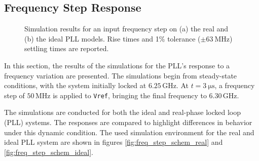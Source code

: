 \documentclass[lettersize,journal]{IEEEtran}
\begin{document}
\subsection{Frequency Step Response}
\label{sec:freq_step}
\begin{figure}[!ht]
    \centering
    \hfil
    \hfil
    \caption{Simulation results for an input frequency step on (a) the real and (b) the ideal PLL models. Rise times and 1\% tolerance ($\pm\SI{63}{\mega\hertz}$) settling times are reported.}
    \label{fig:freq_step_results}
\end{figure}

In this section, the results of the simulations for the PLL’s response to a frequency variation are presented. The simulations begin from steady-state conditions, with the system initially locked at \(6.25 \, \text{GHz}\). At \(t=\SI{3}{\micro\second}\), a frequency step of \(50 \, \text{MHz}\) is applied to \texttt{Vref}, bringing the final frequency to \(6.30 \, \text{GHz}\). 

The simulations are conducted for both the ideal and real-phase locked loop (PLL) systems. The responses are compared to highlight differences in behavior under this dynamic condition.
The used simulation environment for the real and ideal PLL system are shown in figures \ref{fig:freq_step_schem_real} and \ref{fig:freq_step_schem_ideal}.
\end{document}
